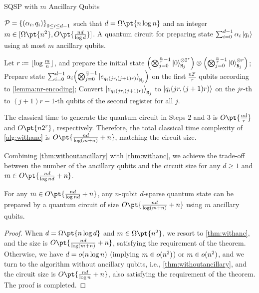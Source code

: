 \documentclass[a4paper,UKenglish,cleveref, autoref, thm-restate]{lipics-v2021}
\DeclarePairedDelimiter\rbra{\lparen}{\rparen}
\DeclarePairedDelimiter\sbra{\lbrack}{\rbrack}
\DeclarePairedDelimiter\cbra{\{}{\}}
\DeclarePairedDelimiter\floor{\lfloor}{\rfloor}
\newcommand{\bo}{O\pt}
\newcommand{\om}{\Omega\pt}
\begin{document}
\begin{algorithm}[htbp]
    \caption{SQSP with $m$ Ancillary Qubits}\label{alg:withanc} 
    \begin{algorithmic}[1]
    \REQUIRE $ \mathcal{P} = \cbra*{\rbra*{\alpha_i, q_i}}_{0\leq i \leq d-1}$ such that $d = \om{n\log n}$  and an integer $m \in \sbra{\om{n^2}, \bo{\frac{nd}{\log d}}}$.
    \ENSURE A quantum circuit for preparing state $\sum_{i=0}^{d-1} \alpha_i \ket{q_i}$ using at most $m$ ancillary qubits.
    
    \STATE Let $r \coloneqq \floor{\log \frac{m}{n}}$, and prepare the initial state $ \rbra*{\bigotimes_{j=0}^{\frac{n}{r}-1}\ket{0}^{\otimes 2^r}_{\texttt{M}_j}} \otimes \rbra*{\bigotimes_{j=0}^{\frac{n}{r}-1}\ket{0}^{\otimes r}_{\texttt{R}_j}}$;
    \STATE Prepare state $\sum_{i=0}^{d-1} \alpha_i \rbra*{\bigotimes_{j=0}^{\frac{n}{r}-1} \ket{e_{q_i(jr, (j+1)r)}}_{\texttt{M}_j}}$ on the first $\frac{n2^r}{r}$ qubits according to \cref{lemma:nr-encoding};
    \STATE Convert $\ket{e_{q_i(jr, (j+1)r)}}_{\texttt{M}_j}$ to $\ket{q_i(jr, (j+1)r)}$ on the $jr$-th to $(j+1)r - 1$-th qubits of the second register for all $j$.
    \end{algorithmic}
\end{algorithm}

The classical time to generate the quantum circuit in Steps 2 and 3 is $\bo{\frac{nd}{r}}$ and $\bo{n2^r}$, respectively. Therefore, the total classical time complexity of \cref{alg:withanc} is $\bo{\frac{nd}{\log (m+n)} + n}$, matching the circuit size.

Combining \cref{thm:withoutancillary} with \cref{thm:withanc}, we achieve the trade-off between the number of the ancillary qubits and the circuit size for any $d \geq 1$ and $m \in \bo{\frac{nd}{\log nd}+n}$.
\begin{theorem}
   For any $m \in \bo{\frac{nd}{\log nd}+n}$, any $n$-qubit $d$-sparse quantum state can be prepared by a quantum circuit of size $\bo{\frac{nd}{\log (m+n)} + n}$ using $m$ ancillary qubits.
\end{theorem}

\begin{proof}
    When $d = \om{n\log d}$ and $m \in \om{n^2}$, we resort to \cref{thm:withanc}, and the size is $\bo{\frac{nd}{\log(m+n)} + n}$, satisfying the requirement of the theorem. Otherwise, we have $d = o\rbra{n\log n}$ (implying $m \in o\rbra{n^2}$) or $m \in o\rbra{n^2}$, and we turn to the algorithm without ancillary qubits, i.e., \cref{thm:withoutancillary}, and the circuit size is $\bo{\frac{nd}{\log n} + n}$, also satisfying the requirement of the theorem. The proof is completed.
\end{proof}
\end{document}
